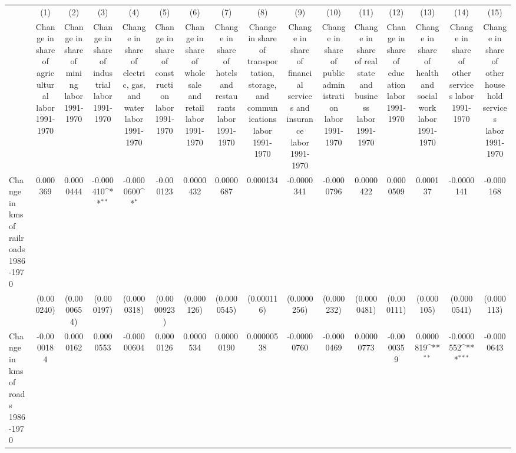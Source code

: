 {
\def\sym#1{\ifmmode^{#1}\else\(^{#1}\)\fi}
\begin{tabular}{l*{15}{c}}
\hline\hline
                &\multicolumn{1}{c}{(1)}&\multicolumn{1}{c}{(2)}&\multicolumn{1}{c}{(3)}&\multicolumn{1}{c}{(4)}&\multicolumn{1}{c}{(5)}&\multicolumn{1}{c}{(6)}&\multicolumn{1}{c}{(7)}&\multicolumn{1}{c}{(8)}&\multicolumn{1}{c}{(9)}&\multicolumn{1}{c}{(10)}&\multicolumn{1}{c}{(11)}&\multicolumn{1}{c}{(12)}&\multicolumn{1}{c}{(13)}&\multicolumn{1}{c}{(14)}&\multicolumn{1}{c}{(15)}\\
                &\multicolumn{1}{c}{Change in share of agricultural labor 1991-1970}&\multicolumn{1}{c}{Change in share of mining labor 1991-1970}&\multicolumn{1}{c}{Change in share of industrial labor 1991-1970}&\multicolumn{1}{c}{Change in share of electric, gas, and water labor 1991-1970}&\multicolumn{1}{c}{Change in share of construction labor 1991-1970}&\multicolumn{1}{c}{Change in share of wholesale and retail labor 1991-1970}&\multicolumn{1}{c}{Change in share of hotels and restaurants labor 1991-1970}&\multicolumn{1}{c}{Change in share of transportation, storage, and communications labor 1991-1970}&\multicolumn{1}{c}{Change in share of financial services and insurance labor 1991-1970}&\multicolumn{1}{c}{Change in share of public administration labor 1991-1970}&\multicolumn{1}{c}{Change in share of real state and business labor 1991-1970}&\multicolumn{1}{c}{Change in share of education labor 1991-1970}&\multicolumn{1}{c}{Change in share of health and social work labor 1991-1970}&\multicolumn{1}{c}{Change in share of other services labor 1991-1970}&\multicolumn{1}{c}{Change in share of other household services labor 1991-1970}\\
\hline
Change in kms of railroads 1986-1970& 0.000369         &0.0000444         &-0.000410\sym{**} &-0.0000600\sym{*}  &-0.000123         &0.0000432         &0.0000687         & 0.000134         &-0.0000341         &-0.0000796         &0.0000422         &0.0000509         & 0.000137         &-0.0000141         &-0.000168         \\
                &(0.000240)         &(0.0000654)         &(0.000197)         &(0.0000318)         &(0.0000923)         &(0.000126)         &(0.0000545)         &(0.000116)         &(0.0000256)         &(0.000232)         &(0.0000481)         &(0.000111)         &(0.000105)         &(0.0000541)         &(0.000113)         \\
[1em]
Change in kms of roads 1986-1970&-0.0000184         &0.0000162         &0.0000553         &-0.00000604         &0.0000126         &0.0000534         &0.00000190         &0.00000538         &-0.00000760         &-0.0000469         &0.00000773         &-0.0000359         &0.0000819\sym{**} &-0.0000552\sym{***}&-0.0000643         \\

\end{tabular}}
